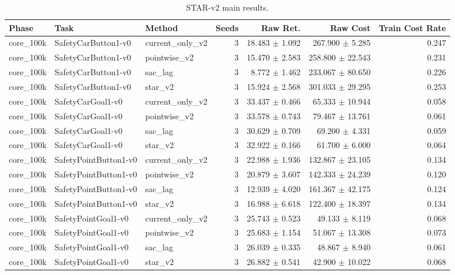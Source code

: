 \begin{table}[t]
\centering
\caption{STAR-v2 main results.}
\label{tab:star-v2-main}
\begin{tabular}{lllrrrr}
\toprule
Phase & Task & Method & Seeds & Raw Ret. & Raw Cost & Train Cost Rate \\
\midrule
core_100k & SafetyCarButton1-v0 & current_only_v2 & 3 & 18.483 $\pm$ 1.092 & 267.900 $\pm$ 5.285 & 0.247 \\
core_100k & SafetyCarButton1-v0 & pointwise_v2 & 3 & 15.470 $\pm$ 2.583 & 258.800 $\pm$ 22.543 & 0.231 \\
core_100k & SafetyCarButton1-v0 & sac_lag & 3 & 8.772 $\pm$ 1.462 & 233.067 $\pm$ 80.650 & 0.226 \\
core_100k & SafetyCarButton1-v0 & star_v2 & 3 & 15.924 $\pm$ 2.568 & 301.033 $\pm$ 29.295 & 0.253 \\
core_100k & SafetyCarGoal1-v0 & current_only_v2 & 3 & 33.437 $\pm$ 0.466 & 65.333 $\pm$ 10.944 & 0.058 \\
core_100k & SafetyCarGoal1-v0 & pointwise_v2 & 3 & 33.578 $\pm$ 0.743 & 79.467 $\pm$ 13.761 & 0.061 \\
core_100k & SafetyCarGoal1-v0 & sac_lag & 3 & 30.629 $\pm$ 0.709 & 69.200 $\pm$ 4.331 & 0.059 \\
core_100k & SafetyCarGoal1-v0 & star_v2 & 3 & 32.922 $\pm$ 0.166 & 61.700 $\pm$ 6.000 & 0.064 \\
core_100k & SafetyPointButton1-v0 & current_only_v2 & 3 & 22.988 $\pm$ 1.936 & 132.867 $\pm$ 23.105 & 0.134 \\
core_100k & SafetyPointButton1-v0 & pointwise_v2 & 3 & 20.879 $\pm$ 3.607 & 142.333 $\pm$ 24.239 & 0.120 \\
core_100k & SafetyPointButton1-v0 & sac_lag & 3 & 12.939 $\pm$ 4.020 & 161.367 $\pm$ 42.175 & 0.124 \\
core_100k & SafetyPointButton1-v0 & star_v2 & 3 & 16.988 $\pm$ 6.618 & 122.400 $\pm$ 18.397 & 0.134 \\
core_100k & SafetyPointGoal1-v0 & current_only_v2 & 3 & 25.743 $\pm$ 0.523 & 49.133 $\pm$ 8.119 & 0.068 \\
core_100k & SafetyPointGoal1-v0 & pointwise_v2 & 3 & 25.683 $\pm$ 1.154 & 51.067 $\pm$ 13.308 & 0.073 \\
core_100k & SafetyPointGoal1-v0 & sac_lag & 3 & 26.039 $\pm$ 0.335 & 48.867 $\pm$ 8.940 & 0.061 \\
core_100k & SafetyPointGoal1-v0 & star_v2 & 3 & 26.882 $\pm$ 0.541 & 42.900 $\pm$ 10.022 & 0.068 \\

\end{tabular}
\end{table}
